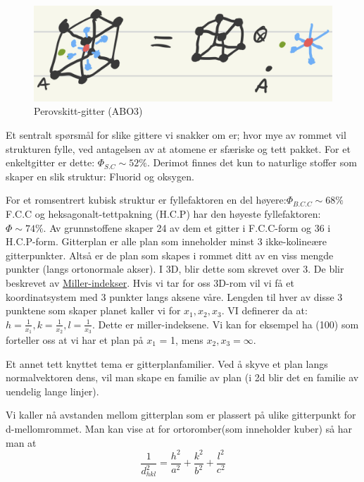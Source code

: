 \documentclass{article}
\begin{document}
\begin{figure}[H]
    \centering
    \includegraphics[width=0.5\linewidth]{bilder/perovskitt_gitter.png}
    \caption{Perovskitt-gitter (ABO3)}
    \label{fig:perovskitt_gitter}
\end{figure}
Et sentralt spørsmål for slike gittere vi snakker om er; hvor mye av rommet vil strukturen fylle, ved antagelsen av at atomene er sfæriske og tett pakket. For et enkeltgitter er dette: $\Phi_{S.C} \sim 52\%$. Derimot finnes det kun to naturlige stoffer som skaper en slik struktur: Fluorid og oksygen.

For et romsentrert kubisk struktur er fyllefaktoren en del høyere:$\Phi_{B.C.C} \sim 68\%$
F.C.C og heksagonalt-tettpakning (H.C.P) har den høyeste fyllefaktoren: $\Phi \sim 74\%$. Av grunnstoffene skaper 24 av dem et gitter i F.C.C-form og 36 i H.C.P-form.
Gitterplan er alle plan som inneholder minst 3 ikke-kolineære gitterpunkter. Altså er de plan som skapes i rommet ditt av en viss mengde punkter (langs ortonormale akser). I 3D, blir dette som skrevet over 3. De blir beskrevet av \underline{Miller-indekser}.
Hvis vi tar for oss 3D-rom vil vi få et koordinatsystem med 3 punkter langs aksene våre. Lengden til hver av disse 3 punktene som skaper planet kaller vi for $x_1, x_2, x_3$. VI definerer da at: $h = \frac{1}{x_1}, k = \frac{1}{x_2},l = \frac{1}{x_3}$. Dette er miller-indeksene. Vi kan for eksempel ha (100) som forteller oss at vi har et plan på $x_1$ = 1, mens $x_2, x_3 = \infty$.

Et annet tett knyttet tema er gitterplanfamilier. Ved å skyve et plan langs normalvektoren dens, vil man skape en familie av plan (i 2d blir det en familie av uendelig lange linjer).

Vi kaller nå avstanden mellom gitterplan som er plassert på ulike gitterpunkt for d-mellomrommet. Man kan vise at for ortoromber(som inneholder kuber) så har man at
\begin{equation}
    \frac{1}{d^{2}_{hkl}} = \frac{h^2}{a^2} + \frac{k^2}{b^2} + \frac{l^2}{c^2}
\end{equation}
\end{document}
